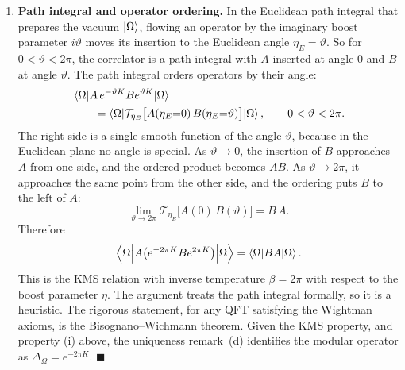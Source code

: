 \begin{workedexamplebox}
\begin{enumerate}[leftmargin=*]
\item \textbf{Path integral and operator ordering.}
In the Euclidean path integral that prepares the vacuum $\ket\Omega$, flowing an operator by the imaginary
boost parameter $i\vartheta$ moves its insertion to the Euclidean angle $\eta_E=\vartheta$. So for
$0<\vartheta<2\pi$, the correlator is a path integral with $A$ inserted at angle $0$ and $B$ at angle
$\vartheta$. The path integral orders operators by their angle:
\[
\begin{aligned}
&\braket{\Omega | A \, e^{-\vartheta K} B e^{\vartheta K} | \Omega} \\
&\qquad = \braket{\Omega | \mathcal{T}_{\eta_E} \big[ A(\eta_E{=}0)\, B(\eta_E{=}\vartheta) \big] | \Omega} ,
\qquad 0<\vartheta<2\pi .
\end{aligned}
\]
The right side is a single smooth function of the angle $\vartheta$, because in the Euclidean plane no angle is
special. As $\vartheta\to0$, the insertion of $B$ approaches $A$ from one side, and the ordered product becomes
$AB$. As $\vartheta\to2\pi$, it approaches the same point from the other side, and the ordering puts $B$ to the
left of $A$:
\[
\lim_{\vartheta\to2\pi}\mathcal{T}_{\eta_E} \big[ A(0)\, B(\vartheta) \big] = B\,A .
\]
Therefore
\[
\Braket{\Omega \Big| A \big( e^{-2\pi K} B e^{2\pi K} \big) \Big| \Omega} = \braket{\Omega | B A | \Omega} .
\]
This is the KMS relation with inverse temperature $\beta = 2\pi$ with respect to the boost parameter $\eta$.
The argument treats the path integral formally, so it is a heuristic. The rigorous statement, for any QFT
satisfying the Wightman axioms, is the Bisognano--Wichmann theorem. Given the KMS property, and property (i)
above, the uniqueness remark~(d) identifies the modular operator as $\Delta_\Omega = e^{-2\pi K}$.
$\blacksquare$
\end{enumerate}
\end{workedexamplebox}

